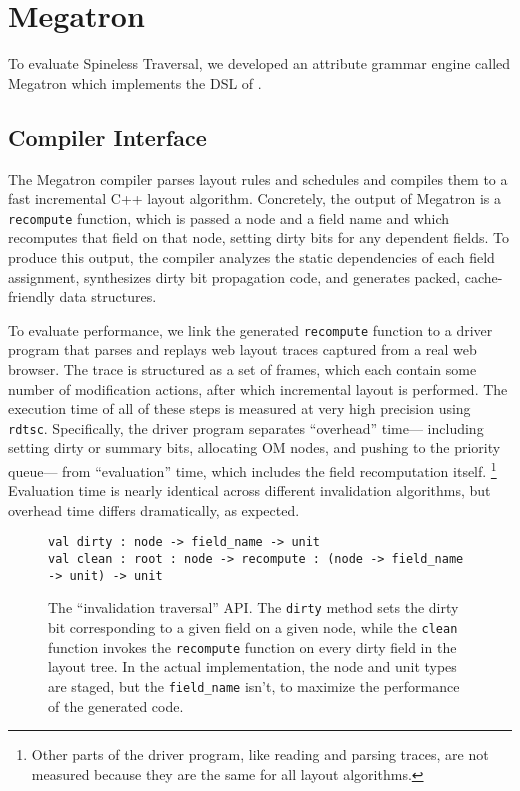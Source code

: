 \section{Megatron}

To evaluate Spineless Traversal,
  we developed an attribute grammar engine called Megatron
  which implements the DSL of .

\subsection{Compiler Interface}
\label{sec:compiler}

The Megatron compiler
  parses layout rules and schedules
  and compiles them to a fast incremental C++ layout algorithm.
Concretely, the output of Megatron
  is a \texttt{recompute} function,
  which is passed a node and a field name
  and which recomputes that field on that node,
  setting dirty bits for any dependent fields.
To produce this output, the compiler
  analyzes the static dependencies of each field assignment,
  synthesizes dirty bit propagation code,
  and generates packed, cache-friendly data structures.

To evaluate performance,
  we link the generated \texttt{recompute} function
  to a driver program that parses and replays web layout traces
  captured from a real web browser.
The trace is structured as a set of frames,
  which each contain some number of modification actions,
  after which incremental layout is performed.
The execution time of all of these steps is measured
  at very high precision using \texttt{rdtsc}.
Specifically, the driver program
  separates ``overhead'' time---%
  including setting dirty or summary bits,
  allocating OM nodes, and pushing to the priority queue---%
  from ``evaluation'' time,
  which includes the field recomputation itself.%
\footnote{
  Other parts of the driver program,
    like reading and parsing traces, are not measured
    because they are the same for all layout algorithms.}
Evaluation time is nearly identical
  across different invalidation algorithms,
  but overhead time differs dramatically, as expected.

\begin{figure}[tbp]
\begin{verbatim}
val dirty : node -> field_name -> unit
val clean : root : node -> recompute : (node -> field_name -> unit) -> unit
\end{verbatim}
\caption{
  The ``invalidation traversal'' API.
  The \texttt{dirty} method sets the dirty bit
    corresponding to a given field on a given node,
    while the \texttt{clean} function
    invokes the \texttt{recompute} function
    on every dirty field in the layout tree.
  In the actual implementation,
    the node and unit types are staged,
    but the \texttt{field_name} isn't,
    to maximize the performance of the generated code.}
\label{fig:traversal-api}
\end{figure}

